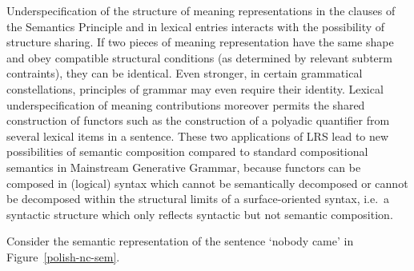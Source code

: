 \documentclass[output=paper]{langsci/langscibook}
\begin{document}
Underspecification of the structure of meaning representations in the
clauses of the Semantics Principle and in lexical entries interacts
with the possibility of structure sharing. If two pieces of meaning
representation have the same shape and obey compatible structural
conditions (as determined by relevant subterm contraints), they can be
identical. Even stronger, in certain grammatical constellations,
principles of grammar may even require their
identity. Lexical underspecification of meaning contributions moreover
permits the shared construction of functors such as the construction
of a polyadic quantifier from several lexical items in a
sentence. These two applications of LRS lead to new possibilities
of semantic composition compared to standard compositional semantics
in Mainstream Generative Grammar, because functors can be composed in (logical) syntax
which cannot be semantically decomposed or cannot be decomposed within
the structural limits of a surface-oriented syntax, i.e.\ a syntactic
structure which only reflects syntactic but not semantic composition.





Consider the semantic representation of the  sentence  `nobody came' in Figure~\ref{polish-nc-sem}. 

\end{document}
